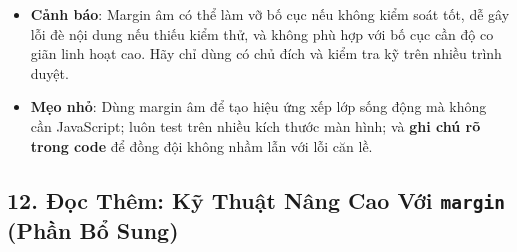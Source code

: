 \documentclass[11pt,oneside]{book}
\newcommand{\thd}[1]{\textcolor{white}{\textbf{\strut #1}}}
\newcommand{\term}[1]{\textbf{\textcolor{primaryBlue}{#1}}}
\DeclareRobustCommand{\csshint}[1]{\texorpdfstring{\textcolor{accentOrange}{\textbf{\texttt{#1}}}}{#1}}
\begin{document}
\begin{prettyTableBox}
\end{prettyTableBox}

\begin{warnBox}
\begin{itemize}[leftmargin=1.5em, itemsep=2.5pt, parsep=0pt]
    \item \textbf{Cảnh báo}: Margin âm có thể làm vỡ bố cục nếu không kiểm soát tốt, dễ gây lỗi đè nội dung nếu thiếu kiểm thử, và không phù hợp với bố cục cần độ co giãn linh hoạt cao. Hãy chỉ dùng có chủ đích và kiểm tra kỹ trên nhiều trình duyệt.
    \item \textbf{Mẹo nhỏ}: Dùng margin âm để tạo hiệu ứng xếp lớp sống động mà không cần JavaScript; luôn test trên nhiều kích thước màn hình; và \textbf{ghi chú rõ trong code} để đồng đội không nhầm lẫn với lỗi căn lề.
\end{itemize}
\end{warnBox}

\subsection{12. Đọc Thêm: Kỹ Thuật Nâng Cao Với \csshint{margin} (Phần Bổ Sung)}
\end{document}
